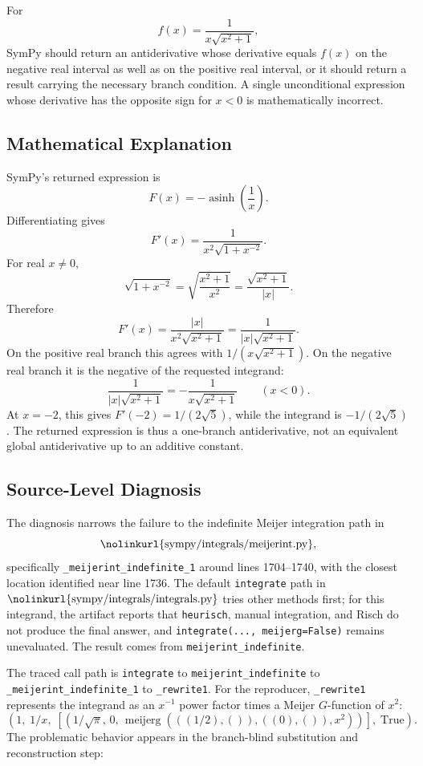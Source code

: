 \documentclass[11pt]{article}
\begin{document}
For
\[
  f(x)=\frac{1}{x\sqrt{x^2+1}},
\]
SymPy should return an antiderivative whose derivative equals \(f(x)\) on the negative real interval as well as on the positive real interval, or it should return a result carrying the necessary branch condition. A single unconditional expression whose derivative has the opposite sign for \(x<0\) is mathematically incorrect.

\subsection{Mathematical Explanation}

SymPy's returned expression is
\[
  F(x)=-\operatorname{asinh}\!\left(\frac{1}{x}\right).
\]
Differentiating gives
\[
  F'(x)
  =
  \frac{1}{x^2\sqrt{1+x^{-2}}}.
\]
For real \(x\ne 0\),
\[
  \sqrt{1+x^{-2}}
  =
  \sqrt{\frac{x^2+1}{x^2}}
  =
  \frac{\sqrt{x^2+1}}{|x|}.
\]
Therefore
\[
  F'(x)
  =
  \frac{|x|}{x^2\sqrt{x^2+1}}
  =
  \frac{1}{|x|\sqrt{x^2+1}}.
\]
On the positive real branch this agrees with \(1/(x\sqrt{x^2+1})\). On the negative real branch it is the negative of the requested integrand:
\[
  \frac{1}{|x|\sqrt{x^2+1}}
  =
  -\frac{1}{x\sqrt{x^2+1}}
  \qquad (x<0).
\]
At \(x=-2\), this gives \(F'(-2)=1/(2\sqrt{5})\), while the integrand is \(-1/(2\sqrt{5})\). The returned expression is thus a one-branch antiderivative, not an equivalent global antiderivative up to an additive constant.

\subsection{Source-Level Diagnosis}

The diagnosis narrows the failure to the indefinite Meijer integration path in
\[
  \text{\nolinkurl{sympy/integrals/meijerint.py}},
\]
specifically \texttt{\_meijerint\_indefinite\_1} around lines 1704--1740, with the closest location identified near line 1736. The default \texttt{integrate} path in \(\text{\nolinkurl{sympy/integrals/integrals.py}}\) tries other methods first; for this integrand, the artifact reports that \texttt{heurisch}, manual integration, and Risch do not produce the final answer, and \texttt{integrate(..., meijerg=False)} remains unevaluated. The result comes from \texttt{meijerint\_indefinite}.

The traced call path is \texttt{integrate} to \texttt{meijerint\_indefinite} to \texttt{\_meijerint\_indefinite\_1} to \texttt{\_rewrite1}. For the reproducer, \texttt{\_rewrite1} represents the integrand as an \(x^{-1}\) power factor times a Meijer \(G\)-function of \(x^2\):
\[
  (1,\;1/x,\;[(1/\sqrt{\pi},\,0,\,
  \operatorname{meijerg}(((1/2),()),((0),()),x^2))],\;\mathrm{True}).
\]
The problematic behavior appears in the branch-blind substitution and reconstruction step:
\end{document}
